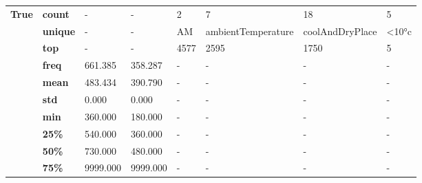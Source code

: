 \begin{tabularx}{\linewidth}{lXXXXXXX}
\cline{1-8}
\multirow{10}{*}{\textbf{True }} & \textbf{count} &                    - &                        - &                    2 &                       7 &                      18 &           5 \\
      & \textbf{unique} &                    - &                        - &                   AM &      ambientTemperature &         coolAndDryPlace &       <10°c \\
      & \textbf{top} &                    - &                        - &                 4577 &                    2595 &                    1750 &           5 \\
      & \textbf{freq} &              661.385 &                  358.287 &                    - &                       - &                       - &           - \\
      & \textbf{mean} &              483.434 &                  390.790 &                    - &                       - &                       - &           - \\
      & \textbf{std} &                0.000 &                    0.000 &                    - &                       - &                       - &           - \\
      & \textbf{min} &              360.000 &                  180.000 &                    - &                       - &                       - &           - \\
      & \textbf{25\%} &              540.000 &                  360.000 &                    - &                       - &                       - &           - \\
      & \textbf{50\%} &              730.000 &                  480.000 &                    - &                       - &                       - &           - \\
      & \textbf{75\%} &             9999.000 &                 9999.000 &                    - &                       - &                       - &           - \\
\bottomrule
\end{tabularx}
